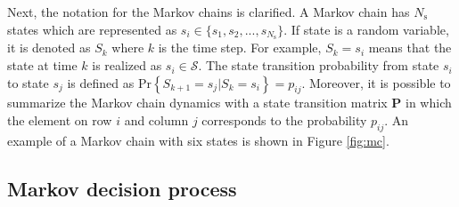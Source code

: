 \documentclass[english, 12pt, a4paper, elec, utf8, a-1b, online]{aaltothesis}
\renewcommand{\vec}[1]{\mathbf{#1}}
\newcommand{\Ss}{\mathcal{S}}
\renewcommand{\Pr}[1]{\text{Pr}\left\{ #1 \right\}}
\newcommand{\stprobs}{\vec{P}}
\newcommand{\nstates}{{N_\text{s}}}
\begin{document}
Next, the notation for the Markov chains is clarified.
A Markov chain has $\nstates$ states which are represented as $s_i \in \{s_1, s_2, ..., s_{\nstates} \}$.
If state is a random variable, it is denoted as $S_k$ where $k$ is the time step.
For example, $S_k = s_i$ means that the state at time $k$ is realized as $s_i \in \Ss$. 
The state transition probability from state $s_i$ to state $s_j$ is defined as $\Pr{S_{k+1}=s_j | S_{k}=s_i}=p_{ij}$.
Moreover, it is possible to summarize the Markov chain dynamics with a state transition matrix $\stprobs$ in which the element on row $i$ and column $j$ corresponds to the probability $p_{ij}$.
An example of a Markov chain with six states is shown in Figure \ref{fig:mc}.

\subsection{Markov decision process} \label{sec:MDP}
\end{document}
